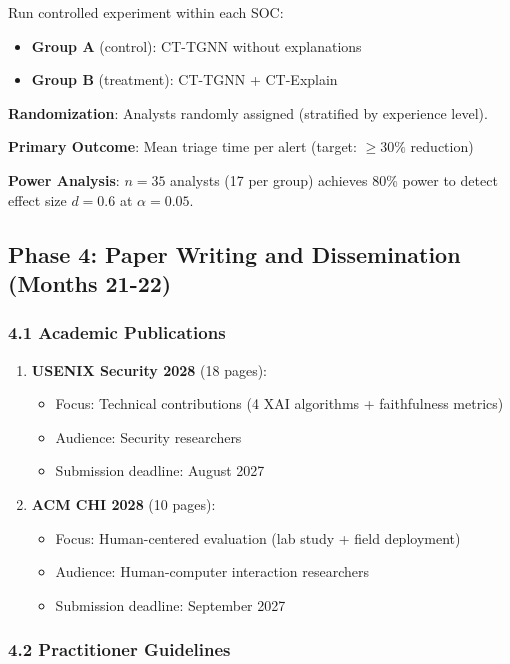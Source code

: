 \documentclass[11pt]{article}
\begin{document}
Run controlled experiment within each SOC:
\begin{itemize}
    \item \textbf{Group A} (control): CT-TGNN without explanations
    \item \textbf{Group B} (treatment): CT-TGNN + CT-Explain
\end{itemize}

\textbf{Randomization}: Analysts randomly assigned (stratified by experience level).

\textbf{Primary Outcome}: Mean triage time per alert (target: $\geq 30\%$ reduction)

\textbf{Power Analysis}: $n = 35$ analysts (17 per group) achieves 80\% power to detect effect size $d = 0.6$ at $\alpha = 0.05$.

\subsection{Phase 4: Paper Writing and Dissemination (Months 21-22)}

\subsubsection{4.1 Academic Publications}

\begin{enumerate}
    \item \textbf{USENIX Security 2028} (18 pages):
    \begin{itemize}
        \item Focus: Technical contributions (4 XAI algorithms + faithfulness metrics)
        \item Audience: Security researchers
        \item Submission deadline: August 2027
    \end{itemize}

    \item \textbf{ACM CHI 2028} (10 pages):
    \begin{itemize}
        \item Focus: Human-centered evaluation (lab study + field deployment)
        \item Audience: Human-computer interaction researchers
        \item Submission deadline: September 2027
    \end{itemize}
\end{enumerate}

\subsubsection{4.2 Practitioner Guidelines}
\end{document}
